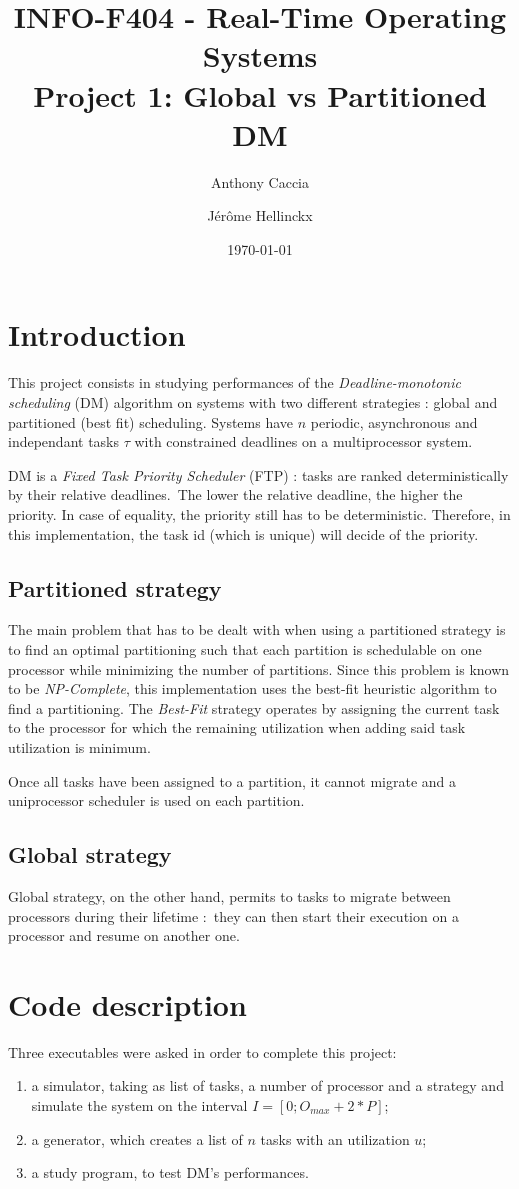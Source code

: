 \documentclass[a4paper]{article}
\title{INFO-F404 - Real-Time Operating Systems\\Project 1: Global vs Partitioned DM}
\author{Anthony Caccia \and J\'{e}r\^{o}me Hellinckx}
\date{\today}
\begin{document}
\renewcommand{\labelitemi}{$\bullet$}
\maketitle

\section{Introduction}
This project consists in studying performances of the \emph{Deadline-monotonic scheduling} (DM) algorithm on systems with two different strategies : global and partitioned (best fit) scheduling. Systems have $n$ periodic, asynchronous and independant tasks $\tau$ with constrained deadlines on a multiprocessor system.

DM is a \emph{Fixed Task Priority Scheduler} (FTP) : tasks are ranked deterministically by their relative deadlines. The lower the relative deadline, the higher the priority. In case of equality, the priority still has to be deterministic. Therefore, in this implementation, the task id (which is unique) will decide of the priority.

\subsection{Partitioned strategy}
The main problem that has to be dealt with when using a partitioned strategy is to find an optimal partitioning such that each partition is schedulable on one processor while minimizing the number of partitions. Since this problem is known to be \emph{NP-Complete}, this implementation uses the best-fit heuristic algorithm to find a partitioning. The \emph{Best-Fit} strategy operates by assigning the current task to the processor for which the remaining utilization when adding said task utilization is minimum.

Once all tasks have been assigned to a partition, it cannot migrate and a uniprocessor scheduler is used on each partition. 

\subsection{Global strategy}
Global strategy, on the other hand, permits to tasks to migrate between processors during their lifetime : they can then start their execution on a processor and resume on another one.

\section{Code description}
Three executables were asked in order to complete this project:
\begin{enumerate}
  \item a simulator, taking as list of tasks, a number of processor and a strategy and simulate the system on the interval $I = [0; O_{max} + 2 * P]$;
  \item a generator, which creates a list of $n$ tasks with an utilization $u$;
  \item a study program, to test DM's performances.
\end{enumerate}
\end{document}
